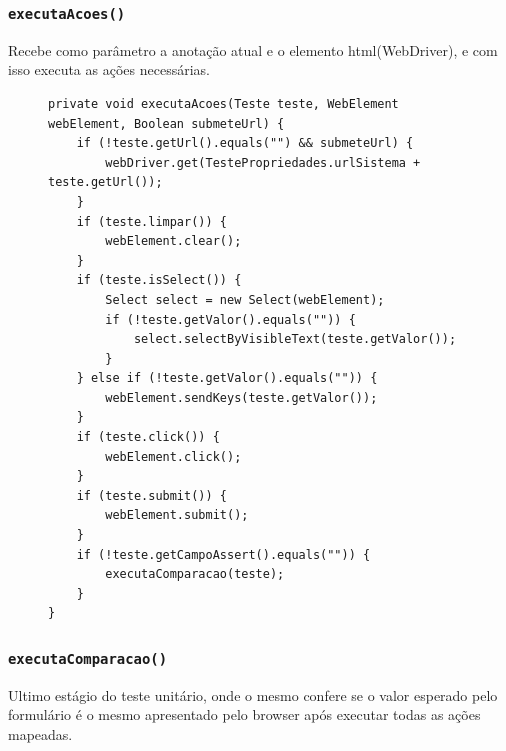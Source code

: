 \documentclass[tg]{mdtufsm}
\begin{document}
\subsubsection{\texttt{executaAcoes()}}
Recebe como parâmetro a anotação atual e o elemento html(WebDriver), e com isso executa as ações necessárias.

\begin{figure}[!htb]
\begin{lstlisting}
private void executaAcoes(Teste teste, WebElement webElement, Boolean submeteUrl) {
	if (!teste.getUrl().equals("") && submeteUrl) {
        webDriver.get(TestePropriedades.urlSistema + teste.getUrl());
    }
    if (teste.limpar()) {
        webElement.clear();
    }
    if (teste.isSelect()) {
        Select select = new Select(webElement);
        if (!teste.getValor().equals("")) {
            select.selectByVisibleText(teste.getValor());
        }
    } else if (!teste.getValor().equals("")) {
        webElement.sendKeys(teste.getValor());
    }
    if (teste.click()) {
        webElement.click();
    }
    if (teste.submit()) {
        webElement.submit();
    }
    if (!teste.getCampoAssert().equals("")) {
        executaComparacao(teste);
    }
}
\end{lstlisting}
	\label{code:executaAcoes}
\end{figure}

\subsubsection{\texttt{executaComparacao()}}
Ultimo estágio do teste unitário, onde o mesmo confere se o valor esperado pelo formulário é o mesmo apresentado pelo browser após executar todas as ações mapeadas.
\end{document}
